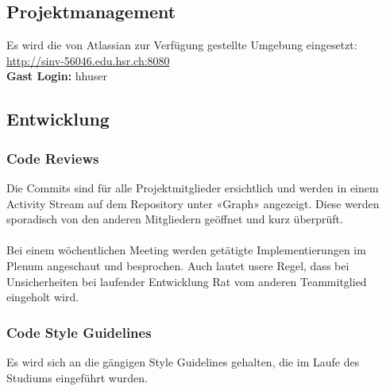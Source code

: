 \subsection*{Projektmanagement}
Es wird die von Atlassian zur Verfügung gestellte Umgebung eingesetzt: \\
\url{http://sinv-56046.edu.hsr.ch:8080} \\
\textbf{Gast Login:} hhuser


\subsection*{Entwicklung}
\subsubsection*{Code Reviews}
Die Commits sind für alle Projektmitglieder ersichtlich und werden in einem Activity Stream auf dem Repository unter «Graph» angezeigt. Diese werden sporadisch von den anderen Mitgliedern geöffnet und kurz überprüft. \\
\\
Bei einem wöchentlichen Meeting werden getätigte Implementierungen im Plenum angeschaut und besprochen. Auch lautet usere Regel, dass bei Unsicherheiten bei laufender Entwicklung Rat vom anderen Teammitglied eingeholt wird.

\subsubsection*{Code Style Guidelines}
Es wird sich an die gängigen Style Guidelines gehalten, die im Laufe des Studiums eingeführt wurden.